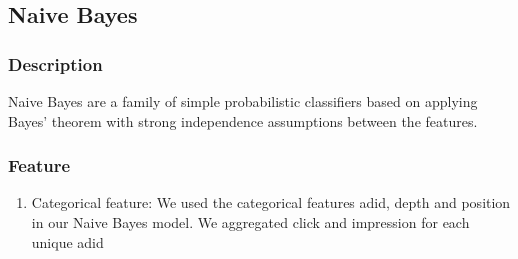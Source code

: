 \documentclass[12pt]{article}
\begin{document}
\subsection{Naive Bayes}
\subsubsection{Description}
Naive Bayes are a family of simple probabilistic classifiers based on applying Bayes' theorem with strong independence assumptions between the features. 

\subsubsection{Feature}
\begin{enumerate}
    \item Categorical feature: We used the categorical features adid, depth and position in our Naive Bayes  model. We aggregated click and impression for each unique adid

  \end{enumerate}%
\end{document}
